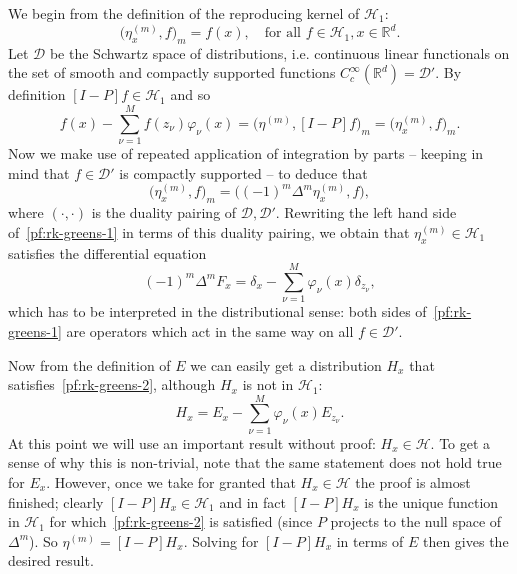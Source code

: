 \documentclass{article}
\newcommand{\mc}[1]{\mathcal{#1}}
\newcommand{\Reals}{\mathbb{R}} %
\newcommand{\Rd}{\Reals^d}
\newcommand{\1}{\mathbf{1}}
\begin{document}
We begin from the definition of the reproducing kernel of $\mc{H}_1$:
\begin{equation*}
\bigl(\eta_x^{(m)},f\bigr)_m = f(x), \quad \textrm{for all $f \in \mc{H}_1, x \in \Reals^d$.}
\end{equation*}
Let $\mc{D}$ be the Schwartz space of distributions, i.e. continuous linear functionals on the set of smooth and compactly supported functions $C_c^{\infty}(\Rd) = \mc{D}'$. By definition $[I - P]f \in \mc{H}_1$ and so
\begin{equation}
\label{pf:rk-greens-1}
f(x) - \sum_{\nu = 1}^{M} f(z_{\nu}) \varphi_{\nu}(x) = \bigl(\eta^{(m)},[I - P]f\bigr)_m = \bigl(\eta_x^{(m)},f\bigr)_m.
\end{equation}
Now we make use of repeated application of integration by parts -- keeping in mind that $f \in \mc{D}'$ is compactly supported -- to deduce that
\begin{equation*}
\bigl(\eta_x^{(m)},f\bigr)_m = \bigl((-1)^m \Delta^m \eta_x^{(m)},f\bigr),
\end{equation*}
where $(\cdot,\cdot)$ is the duality pairing of $\mc{D},\mc{D}'$. Rewriting the left hand side of~\eqref{pf:rk-greens-1} in terms of this duality pairing, we obtain that $\eta_x^{(m)} \in \mc{H}_1$ satisfies the differential equation
\begin{equation}
\label{pf:rk-greens-2}
(-1)^m \Delta^m F_x = \delta_{x} - \sum_{\nu = 1}^{M} \varphi_{\nu}(x) \delta_{z_\nu},
\end{equation}
which has to be interpreted in the distributional sense: both sides of~\eqref{pf:rk-greens-1} are operators which act in the same way on all $f \in \mc{D}'$.

Now from the definition of $E$ we can easily get a distribution $H_x$ that satisfies~\eqref{pf:rk-greens-2}, although $H_x$ is not in $\mc{H}_1$:
\begin{equation*}
H_x = E_x - \sum_{\nu = 1}^{M} \varphi_{\nu}(x) E_{z_{\nu}}.
\end{equation*}
At this point we will use an important result without proof: $H_x \in \mc{H}$. To get a sense of why this is non-trivial, note that the same statement does not hold true for $E_x$. However, once we take for granted that $H_x \in \mc{H}$ the proof is almost finished; clearly $[I - P]H_x \in \mc{H}_1$ and in fact $[I - P]H_x$ is the unique function in $\mc{H}_1$ for which~\eqref{pf:rk-greens-2} is satisfied (since $P$ projects to the null space of $\Delta^m$). So $\eta^{(m)} = [I - P]H_x$. Solving for $[I - P]H_x$ in terms of $E$ then gives the desired result.
\end{document}
